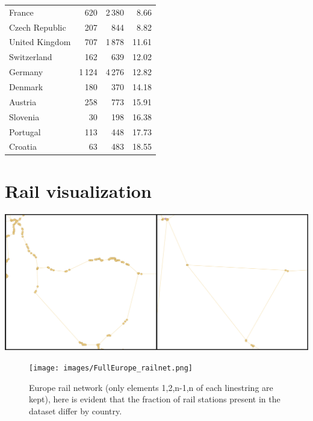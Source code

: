 \begin{appendices}
\begin{table}[!htbp]
\begin{tabular}{@{}lrrr@{}}
    France             &   620 &  2\,380 &   8.66 \\
    Czech Republic     &   207 &    844 &   8.82 \\
    United Kingdom     &   707 &  1\,878 &  11.61 \\
    Switzerland        &   162 &    639 &  12.02 \\
    Germany            & 1\,124 &  4\,276 &  12.82 \\
    Denmark            &   180 &    370 &  14.18 \\
    Austria            &   258 &    773 &  15.91 \\
    Slovenia           &    30 &    198 &  16.38 \\
    Portugal           &   113 &    448 &  17.73 \\
    Croatia            &    63 &    483 &  18.55 \\
    \bottomrule
  \end{tabular}
\end{table}
\clearpage
\section{Rail visualization}
\label{app:ralvis}

\vspace*{\fill}       %

\begin{center}
  \includegraphics[width=14cm,keepaspectratio]{images/1000107259.jpg}

\end{center}

\vspace*{\fill}       %


\begin{figure}[htbp]
  \centering
  \texttt{[image: images/FullEurope\_railnet.png]}
  \caption{Europe rail network (only elements 1,2,n-1,n of each linestring are kept), here is evident that the fraction of rail stations present in the dataset differ by country.}
  

\end{figure}
\end{appendices}
